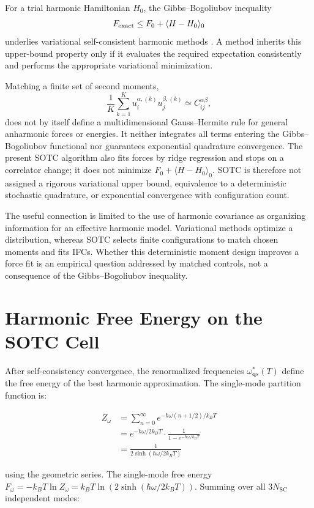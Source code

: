 \documentclass[aps,prb,reprint,amsmath,amssymb,floatfix]{revtex4-2}
\begin{document}
For a trial harmonic Hamiltonian \(H_0\), the Gibbs--Bogoliubov inequality
\[
F_{\rm exact}\leq F_0+\langle H-H_0\rangle_0
\]
underlies variational self-consistent harmonic methods
\cite{ref7,ref8,ref50}. A method inherits this upper-bound property only if it
evaluates the required expectation consistently and performs the appropriate
variational minimization.

Matching a finite set of second moments,
\[
\frac{1}{K}\sum_{k=1}^{K}u_i^{\alpha,(k)}u_j^{\beta,(k)}
 \simeq C_{ij}^{\alpha\beta},
\]
does not by itself define a multidimensional Gauss--Hermite rule for general
anharmonic forces or energies. It neither integrates all terms entering the
Gibbs--Bogoliubov functional nor guarantees exponential quadrature convergence.
The present SOTC algorithm also fits forces by ridge regression and stops on a
correlator change; it does not minimize \(F_0+\langle H-H_0\rangle_0\).
SOTC is therefore not assigned a rigorous variational upper bound,
equivalence to a deterministic stochastic quadrature, or exponential
convergence with configuration count.

The useful connection is limited to the use of harmonic covariance as
organizing information for an effective harmonic model. Variational methods
optimize a distribution, whereas SOTC selects finite configurations to match
chosen moments and fits IFCs. Whether this deterministic moment design improves
a force fit is an empirical question addressed by matched controls, not a
consequence of the Gibbs--Bogoliubov inequality.

\section{Harmonic Free Energy on the SOTC
Cell}\label{appendix-h-harmonic-free-energy-on-the-sotc-cell}

After self-consistency convergence, the renormalized frequencies
\(\omega_{\mathbf{q}s}^*(T)\) define the free energy of the best
harmonic approximation. The single-mode partition function is:

\begin{align*}
Z_\omega
  &= \sum_{n=0}^\infty e^{-\hbar\omega(n+1/2)/k_BT} \\
  &= e^{-\hbar\omega/2k_BT}\cdot\frac{1}{1-e^{-\hbar\omega/k_BT}} \\
  &= \frac{1}{2\sinh(\hbar\omega/2k_BT)}
\end{align*}

using the geometric series. The single-mode free energy
\(F_\omega = -k_BT\ln Z_\omega = k_BT\ln(2\sinh(\hbar\omega/2k_BT))\).
Summing over all \(3N_\text{SC}\) independent modes:
\end{document}
